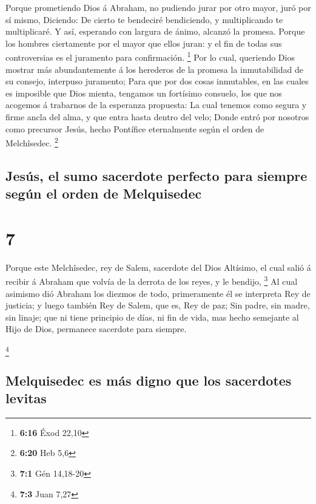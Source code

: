  Porque prometiendo Dios á Abraham, no pudiendo jurar por
otro mayor, juró por sí mismo,  Diciendo: De cierto te
bendeciré bendiciendo, y multiplicando te multiplicaré. 
Y así, esperando con largura de ánimo, alcanzó la promesa.
 Porque los hombres ciertamente por el mayor que ellos
juran: y el fin de todas sus controversias es el juramento para
confirmación. \footnote{\textbf{6:16} Éxod 22,10}  Por lo
cual, queriendo Dios mostrar más abundantemente á los herederos de la
promesa la inmutabilidad de su consejo, interpuso juramento;
 Para que por dos cosas inmutables, en las cuales es
imposible que Dios mienta, tengamos un fortísimo consuelo, los que nos
acogemos á trabarnos de la esperanza propuesta:  La cual
tenemos como segura y firme ancla del alma, y que entra hasta dentro del
velo;  Donde entró por nosotros como precursor Jesús,
hecho Pontífice eternalmente según el orden de Melchîsedec. \footnote{\textbf{6:20}
  Heb 5,6}

\hypertarget{jesuxfas-el-sumo-sacerdote-perfecto-para-siempre-seguxfan-el-orden-de-melquisedec}{%
\subsection{Jesús, el sumo sacerdote perfecto para siempre según el
orden de
Melquisedec}\label{jesuxfas-el-sumo-sacerdote-perfecto-para-siempre-seguxfan-el-orden-de-melquisedec}}

\hypertarget{section-6}{%
\section{7}\label{section-6}}

 Porque este Melchîsedec, rey de Salem, sacerdote del Dios
Altísimo, el cual salió á recibir á Abraham que volvía de la derrota de
los reyes, y le bendijo, \footnote{\textbf{7:1} Gén 14,18-20}
 Al cual asimismo dió Abraham los diezmos de todo,
primeramente él se interpreta Rey de justicia; y luego también Rey de
Salem, que es, Rey de paz;  Sin padre, sin madre, sin
linaje; que ni tiene principio de días, ni fin de vida, mas hecho
semejante al Hijo de Dios, permanece sacerdote para siempre.

\footnote{\textbf{7:3} Juan 7,27}

\hypertarget{melquisedec-es-muxe1s-digno-que-los-sacerdotes-levitas}{%
\subsection{Melquisedec es más digno que los sacerdotes
levitas}\label{melquisedec-es-muxe1s-digno-que-los-sacerdotes-levitas}}

